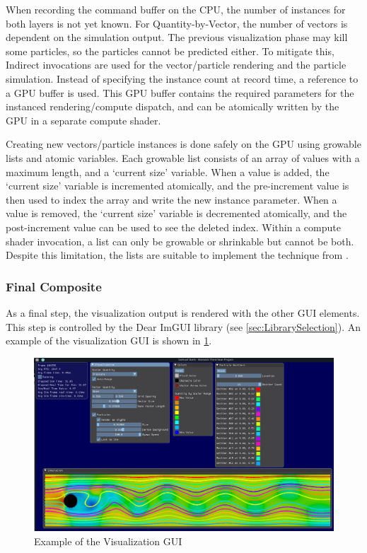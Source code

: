 When recording the command buffer on the CPU, the number of instances for both layers is not yet known.
For Quantity-by-Vector, the number of vectors is dependent on the simulation output.
The previous visualization phase may kill some particles, so the particles cannot be predicted either.
To mitigate this, Indirect invocations are used for the vector/particle rendering and the particle simulation.
Instead of specifying the instance count at record time, a reference to a GPU buffer is used.
This GPU buffer contains the required parameters for the instanced rendering/compute dispatch, and can be atomically written by the GPU in a separate compute shader.

Creating new vectors/particle instances is done safely on the GPU using growable lists and atomic variables.
Each growable list consists of an array of values with a maximum length, and a `current size' variable.
When a value is added, the `current size' variable is incremented atomically, and the pre-increment value is then used to index the array and write the new instance parameter.
When a value is removed, the `current size' variable is decremented atomically, and the post-increment value can be used to see the deleted index.
Within a compute shader invocation, a list can only be growable or shrinkable but cannot be both.
Despite this limitation, the lists are suitable to implement the technique from \cite{WickedEngineParticles}.

\subsubsection{Final Composite}
As a final step, the visualization output is rendered with the other GUI elements.
This step is controlled by the Dear ImGUI library (see \cref{sec:LibrarySelection}).
An example of the visualization GUI is shown in \cref{fig:viz_gui}.

\begin{figure}[p]
    \centering
    \includegraphics[width=\linewidth]{Ch42Design/figures/dan.png}
    \caption{Example of the Visualization GUI}
    \label{fig:viz_gui}
\end{figure}
\clearpage